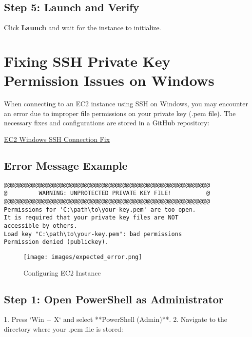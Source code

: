 \documentclass{article}
\begin{document}
\subsection{Step 5: Launch and Verify}
Click \textbf{Launch} and wait for the instance to initialize.

\section{Fixing SSH Private Key Permission Issues on Windows}

When connecting to an EC2 instance using SSH on Windows, you may encounter an error due to improper file permissions on your private key (.pem file). The necessary fixes and configurations are stored in a GitHub repository:

\href{https://github.com/itspriyanshuks17/EC2-Windows-Connect.git}{EC2 Windows SSH Connection Fix}

\subsection{Error Message Example}

\begin{tcolorbox}[colback=gray!10, colframe=black, title=Common Error]
\begin{adjustbox}{minipage=0.95\textwidth}
\begin{verbatim}
@@@@@@@@@@@@@@@@@@@@@@@@@@@@@@@@@@@@@@@@@@@@@@@@@@@@@@@@@@@
@         WARNING: UNPROTECTED PRIVATE KEY FILE!          @
@@@@@@@@@@@@@@@@@@@@@@@@@@@@@@@@@@@@@@@@@@@@@@@@@@@@@@@@@@@
Permissions for 'C:\path\to\your-key.pem' are too open.
It is required that your private key files are NOT 
accessible by others.
Load key "C:\path\to\your-key.pem": bad permissions
Permission denied (publickey).
\end{verbatim}
\end{adjustbox}
\end{tcolorbox}

\begin{figure}[H]
  \centering
  \texttt{[image: images/expected\_error.png]}
  \caption{Configuring EC2 Instance}
  \label{fig:Expected error}
\end{figure}



\subsection{Step 1: Open PowerShell as Administrator}
1. Press `Win + X` and select **PowerShell (Admin)**.
2. Navigate to the directory where your .pem file is stored:
\end{document}
